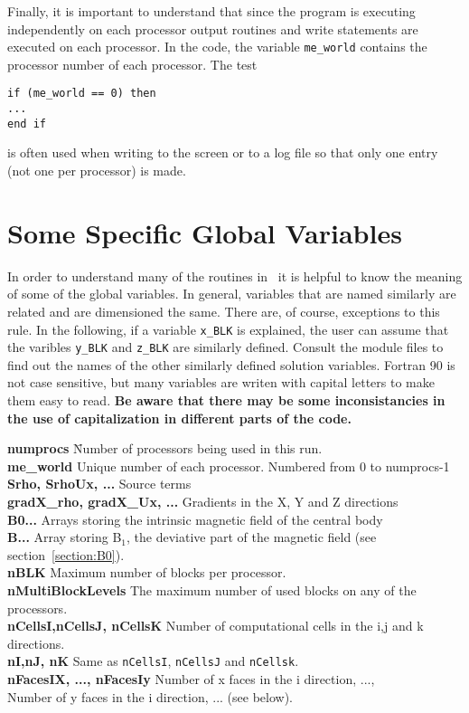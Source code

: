 Finally, it is important to understand that since the program
is executing independently on each processor  output routines
and write statements are executed on each processor.  In the
code, the variable {\tt me\_world} contains the processor number
of each processor.  The test
\begin{verbatim}
if (me_world == 0) then 
...
end if
\end{verbatim}
is often used when writing to the screen or to a log file so
that only one entry (not one per processor) is made.

\section{Some Specific Global Variables \label{section:variables}}

In order to understand many of the routines in \BATSRUS\ it is helpful
to know  the meaning of some of the global variables.  In general,
variables that are named similarly are related and are dimensioned the
same.  There are, of course, exceptions to this rule.  In the following,
if a variable {\tt x\_BLK} is explained, the user can assume that
the varibles {\tt y\_BLK} and {\tt z\_BLK} are similarly defined.
Consult the module files to find out the names of the other similarly defined solution
variables.  Fortran 90 is not case sensitive, but many variables are writen
with capital letters to make them easy to read.  {\bf Be aware that there may be 
some inconsistancies in the use of capitalization in different parts of the code.}

\begin{tabbing}
{\bf numprocs} \hspace{1.0in} \= Number of processors being used in this run. \\
{\bf me\_world}               \> Unique number of each processor. Numbered from 0 to numprocs-1 \\
{\bf Srho, SrhoUx, ...}       \> Source terms \\
{\bf gradX\_rho, gradX\_Ux, ...} \> Gradients in the X, Y and Z directions \\
{\bf B0...}                   \> Arrays storing the intrinsic magnetic field of the central body \\
{\bf B...}                    \> Array storing B$_1$, the deviative part of the magnetic field (see
                                 section~\ref{section:B0}). \\
{\bf nBLK}                    \> Maximum number of blocks per processor. \\
{\bf nMultiBlockLevels}       \> The maximum number of used blocks on any of the processors. \\
{\bf nCellsI,nCellsJ, nCellsK}\> Number of computational cells in the i,j and k directions. \\
{\bf nI,nJ, nK}               \> Same as {\tt nCellsI}, {\tt nCellsJ} and {\tt nCellsk}. \\
{\bf nFacesIX, ..., nFacesIy} \> Number of x faces in the i direction, ..., \\
                              \> Number of y faces in the i direction, ... (see below). 
\end{tabbing}

